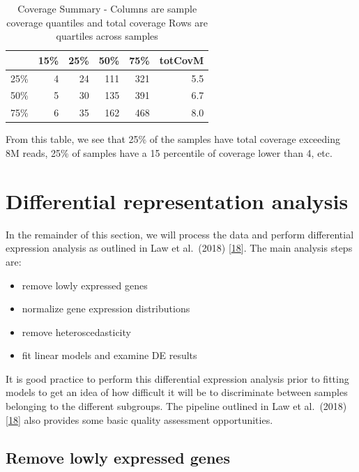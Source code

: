 \documentclass[
]{book}
\providecommand{\tightlist}{%
  \setlength{\itemsep}{0pt}\setlength{\parskip}{0pt}}
\begin{document}
\begin{table}

\caption{\label{tab:hcc5hmC-preproc-hcc5hmC-quantCounts}Coverage Summary - Columns are sample coverage quantiles and total coverage 
Rows are quartiles across samples}
\centering
\begin{tabular}[t]{l|r|r|r|r|r}
\hline
  & 15\% & 25\% & 50\% & 75\% & totCovM\\
\hline
25\% & 4 & 24 & 111 & 321 & 5.5\\
\hline
50\% & 5 & 30 & 135 & 391 & 6.7\\
\hline
75\% & 6 & 35 & 162 & 468 & 8.0\\
\hline
\end{tabular}
\end{table}

From this table, we see that 25\% of the samples have total coverage exceeding
8M reads, 25\% of samples
have a 15 percentile of coverage lower than
4, etc.

\hypertarget{dra}{%
\section{Differential representation analysis}\label{dra}}

In the remainder of this section, we will process the data and
perform differential expression analysis as outlined in
Law et al.~(2018) {[}\protect\hyperlink{ref-Law:2018aa}{18}{]}. The main analysis steps are:

\begin{itemize}
\tightlist
\item
  remove lowly expressed genes
\item
  normalize gene expression distributions
\item
  remove heteroscedasticity
\item
  fit linear models and examine DE results
\end{itemize}

It is good practice to perform this differential expression analysis prior to
fitting models to get an idea of how difficult it will be to discriminate
between samples belonging to the different subgroups. The pipeline
outlined in Law et al.~(2018) {[}\protect\hyperlink{ref-Law:2018aa}{18}{]} also provides some
basic quality assessment opportunities.

\hypertarget{remove-lowly-expressed-genes}{%
\subsection*{Remove lowly expressed genes}\label{remove-lowly-expressed-genes}}
\end{document}

